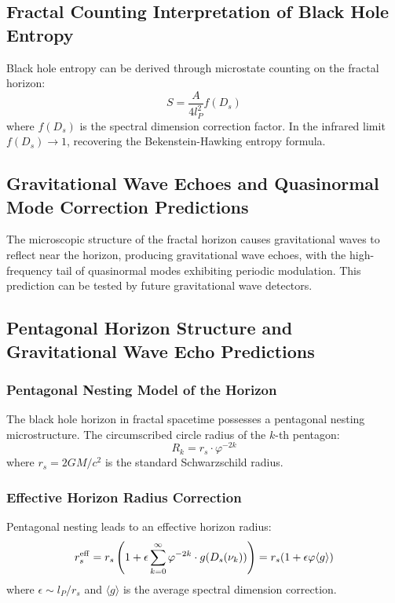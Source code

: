 \documentclass[12pt,a4paper,twocolumn]{article}
\renewcommand{\phi}{\varphi}
\begin{document}
\subsection{Fractal Counting Interpretation of Black Hole Entropy}
Black hole entropy can be derived through microstate counting on the fractal horizon:
\[
S = \frac{A}{4l_P^2} f(D_s)
\]
where $f(D_s)$ is the spectral dimension correction factor. In the infrared limit $f(D_s)\to 1$, recovering the Bekenstein-Hawking entropy formula.

\subsection{Gravitational Wave Echoes and Quasinormal Mode Correction Predictions}
The microscopic structure of the fractal horizon causes gravitational waves to reflect near the horizon, producing gravitational wave echoes, with the high-frequency tail of quasinormal modes exhibiting periodic modulation. This prediction can be tested by future gravitational wave detectors.

\subsection{Pentagonal Horizon Structure and Gravitational Wave Echo Predictions}
\label{subsec:pentagon_horizon}

\subsubsection{Pentagonal Nesting Model of the Horizon}

The black hole horizon in fractal spacetime possesses a pentagonal nesting microstructure. The circumscribed circle radius of the $k$-th pentagon:
\begin{equation}
R_k = r_s \cdot \phi^{-2k}
\end{equation}
where $r_s = 2GM/c^2$ is the standard Schwarzschild radius.

\subsubsection{Effective Horizon Radius Correction}

Pentagonal nesting leads to an effective horizon radius:
\begin{equation}
r_s^{\rm eff} = r_s \left(1 + \epsilon \sum_{k=0}^{\infty}\phi^{-2k} \cdot g(D_s(\nu_k))\right) = r_s(1 + \epsilon\phi\langle g\rangle)
\end{equation}
where $\epsilon \sim l_P/r_s$ and $\langle g\rangle$ is the average spectral dimension correction.
\end{document}
